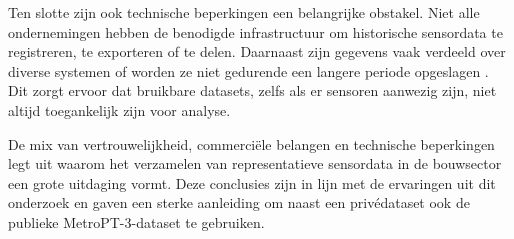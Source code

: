 Ten slotte zijn ook technische beperkingen een belangrijke obstakel. Niet alle ondernemingen hebben de benodigde infrastructuur om historische sensordata te registreren, te exporteren of te delen. Daarnaast zijn gegevens vaak verdeeld over diverse systemen of worden ze niet gedurende een langere periode opgeslagen \autocite{Wang2025, Dissem2024}. Dit zorgt ervoor dat bruikbare datasets, zelfs als er sensoren aanwezig zijn, niet altijd toegankelijk zijn voor analyse.

De mix van vertrouwelijkheid, commerciële belangen en technische beperkingen legt uit waarom het verzamelen van representatieve sensordata in de bouwsector een grote uitdaging vormt. Deze conclusies zijn in lijn met de ervaringen uit dit onderzoek en gaven een sterke aanleiding om naast een privédataset ook de publieke MetroPT-3-dataset te gebruiken.




